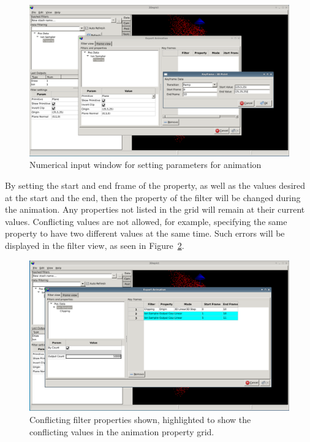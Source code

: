 \documentclass[10pt]{article}
\begin{document}
\begin{figure}
\begin{center}
 \includegraphics[width=0.9 \textwidth,keepaspectratio=true]{./figures/exportanimParamDialog.png}
 \caption{Numerical input window for setting parameters for animation}
\label{fig:animateParamDialog}
\end{center}
\end{figure}

By setting the start and end frame of the property, as well as the values desired at the start and the end, then the property of the filter will be changed during the animation. Any properties not listed in the grid will remain at their current values. Conflicting values are not allowed, for example, specifying the same property to have two different values at the same time. Such errors will be displayed in the filter view, as seen in Figure~\ref{fig:animateParamConflict}. 

\begin{figure}
\begin{center}
 \includegraphics[width=0.9 \textwidth,keepaspectratio=true]{./figures/exportanimDialogConflict.png}
 \caption{Conflicting filter properties shown, highlighted to show the conflicting values in the animation property grid.}
\label{fig:animateParamConflict}
\centering
\end{center}
\end{figure}
\end{document}
